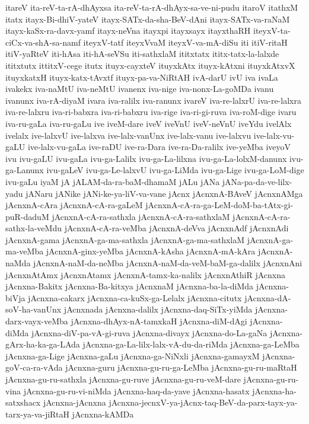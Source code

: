 {itareV
ita-reV-ta-rA-dhAyxsa
ita-reV-ta-rA-dhAyx-sa-ve-ni-pudu
itaroV
itathxM
itatx
itayx-Bi-dhiV-yateV
itayx-SATx-da-sha-BeV-dAni
itayx-SATx-va-raNaM
itayx-kaSx-ra-davx-yamf
itayx-neVna
itayxpi
itayxsayx
itayxthaRH
iteyxV-ta-ciCx-va-shA-sa-namf
iteyxV-tatf
iteyxVvaM
iteyxV-va-mA-diSu
iti
itiV-ritaH
itiV-yaRteV
iti-hAsa
iti-hA-seVSu
iti-sathxlaM
ititxtatx
ititx-tatx-la-lalxde
ititxtutx
ittitxV-cege
itutx
ituyx-cayxteV
ituyxkAtx
ituyx-kAtxni
ituyxkAtxvX
ituyxkatxH
ituyx-katx-tAvxtf
ituyx-pa-va-NiRtAH
ivA-darU
ivU
iva
ivaLa
ivakekx
iva-naMtU
iva-neMtU
ivanenx
iva-nige
iva-nonx-La-goMDa
ivanu
ivanunx
iva-rA-diyaM
ivara
iva-ralilx
iva-ranunx
ivareV
iva-re-lalxrU
iva-re-lalxra
iva-re-lalxru
iva-ri-babxra
iva-ri-babxru
iva-rige
iva-ri-gi-ruva
iva-roM-dige
ivaru
iva-ru-gaLa
iva-ru-gaLu
ive
iveM-dare
iveV
iveVnU
iveV-neVnU
iveYdu
ivelAlx
ivelalx
ive-lalxvU
ive-lalxva
ive-lalx-vanUnx
ive-lalx-vanu
ive-lalxvu
ive-lalx-vu-gaLU
ive-lalx-vu-gaLa
ive-raDU
ive-ra-Dara
ive-ra-Da-ralilx
ive-yeMba
iveyoV
ivu
ivu-gaLU
ivu-gaLa
ivu-ga-Lalilx
ivu-ga-La-lilxna
ivu-ga-La-lolxM-danunx
ivu-ga-Lanunx
ivu-gaLeV
ivu-ga-Le-lalxvU
ivu-ga-LiMda
ivu-ga-Lige
ivu-ga-LoM-dige
ivu-gaLu
iyaM
jA
jALAM-da-ra-baM-dhamaM
jALu
jANa
jANa-pa-da-ve-lilx-yadu
jANaru
jANike
jANi-ke-ya-liV-va-vane
jAcnx
jAcnxnA-BAveV
jAcnxnAMga
jAcnxnA-cAra
jAcnxnA-cA-ra-gaLeM
jAcnxnA-cA-ra-ga-LeM-doM-ba-tAtx-gi-puR-daduM
jAcnxnA-cA-ra-sathxla
jAcnxnA-cA-ra-sathxlaM
jAcnxnA-cA-ra-sathx-la-veMdu
jAcnxnA-cA-ra-veMba
jAcnxnA-deVva
jAcnxnAdf
jAcnxnAdi
jAcnxnA-gama
jAcnxnA-ga-ma-sathxla
jAcnxnA-ga-ma-sathxlaM
jAcnxnA-ga-ma-veMba
jAcnxnA-ginx-yeMba
jAcnxnA-kAsha
jAcnxnA-mA-kAra
jAcnxnA-naMda
jAcnxnA-naM-da-neMba
jAcnxnA-naM-da-veM-baM-ga-dalilx
jAcnxnAni
jAcnxnAtAmx
jAcnxnAtamx
jAcnxnA-tamx-ka-nalilx
jAcnxnAthiR
jAcnxna
jAcnxna-Bakitx
jAcnxna-Ba-kitxya
jAcnxnaM
jAcnxna-ba-la-diMda
jAcnxna-biVja
jAcnxna-cakarx
jAcnxna-ca-kuSx-ga-Lelalx
jAcnxna-citutx
jAcnxna-dA-soV-ha-vanUnx
jAcnxnada
jAcnxna-dalilx
jAcnxna-daq-SiTx-yiMda
jAcnxna-darx-vayx-veMba
jAcnxna-dhAyx-nA-tamxkaH
jAcnxna-diM-dAgi
jAcnxna-diMda
jAcnxna-diV-pa-vA-gi-ruva
jAcnxna-divayx
jAcnxna-do-La-gaNa
jAcnxna-gArx-ha-ka-ga-LAda
jAcnxna-ga-La-lilx-lalx-vA-du-da-riMda
jAcnxna-ga-LeMba
jAcnxna-ga-Lige
jAcnxna-gaLu
jAcnxna-ga-NiNxli
jAcnxna-gamayxM
jAcnxna-goV-ca-ra-vAda
jAcnxna-guru
jAcnxna-gu-ru-ga-LeMba
jAcnxna-gu-ru-maRtaH
jAcnxna-gu-ru-sathxla
jAcnxna-gu-ruve
jAcnxna-gu-ru-veM-dare
jAcnxna-gu-ru-vina
jAcnxna-gu-ru-vi-niMda
jAcnxna-haq-da-yave
jAcnxna-hasatx
jAcnxna-ha-satxshacx
jAcnxna-jAcnxna
jAcnxna-jecnxV-ya-jAcnx-taq-BeV-da-parx-tayx-ya-tarx-ya-va-jiRtaH
jAcnxna-kAMDa
}
